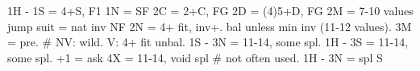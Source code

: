1H - 1S = 4+S, F1
1N = SF
2C = 2+C, FG
2D = (4)5+D, FG
2M = 7-10 values
jump suit = nat inv NF
2N = 4+ fit, inv+. bal unless min inv (11-12 values).
3M = pre.  # NV: wild. V: 4+ fit unbal.
1S - 3N = 11-14, some spl. 1H - 3S = 11-14, some spl.
     +1 = ask
4X = 11-14, void spl  # not often used. 1H - 3N = spl S